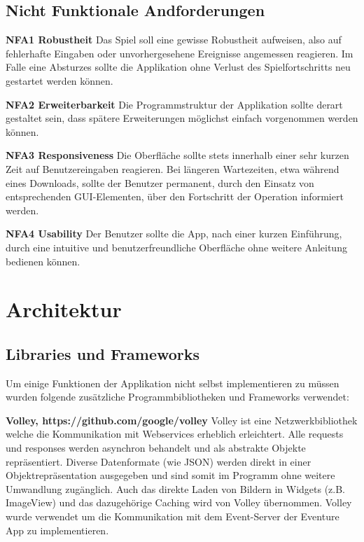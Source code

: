 \documentclass{scrartcl}
\begin{document}
\subsection{Nicht Funktionale Andforderungen}

\textbf{NFA1 Robustheit} \newline
Das Spiel soll eine gewisse Robustheit aufweisen, also auf fehlerhafte Eingaben
oder unvorhergesehene Ereignisse angemessen reagieren. Im Falle eine Absturzes
sollte die Applikation ohne Verlust des Spielfortschritts neu gestartet werden
können.

\textbf{NFA2 Erweiterbarkeit} \newline
Die Programmstruktur der Applikation sollte derart gestaltet sein, dass
spätere Erweiterungen möglichst einfach vorgenommen werden können.

\textbf{NFA3 Responsiveness} \newline
Die Oberfläche sollte stets innerhalb einer sehr kurzen Zeit auf
Benutzereingaben reagieren. Bei längeren Wartezeiten, etwa während eines
Downloads, sollte der Benutzer permanent, durch den Einsatz von entsprechenden
GUI-Elementen, über den Fortschritt der Operation informiert werden.

\textbf{NFA4 Usability} \newline
Der Benutzer sollte die App, nach einer kurzen Einführung, durch eine intuitive
und benutzerfreundliche Oberfläche ohne weitere Anleitung bedienen können.

\newpage

\section{Architektur}

\subsection{Libraries und Frameworks}

Um einige Funktionen der Applikation nicht selbst implementieren zu müssen
wurden folgende zusätzliche Programmbibliotheken und Frameworks verwendet:

\textbf{Volley, https://github.com/google/volley} \newline
Volley ist eine Netzwerkbibliothek welche die Kommunikation mit Webservices
erheblich erleichtert. Alle requests und responses werden asynchron behandelt
und als abstrakte Objekte repräsentiert. Diverse Datenformate (wie JSON) werden
direkt in einer Objektrepräsentation ausgegeben und sind somit im Programm ohne
weitere Umwandlung zugänglich. Auch das direkte Laden von Bildern in Widgets
(z.B. ImageView) und das dazugehörige Caching wird von Volley übernommen. Volley
wurde verwendet um die Kommunikation mit dem Event-Server der Eventure App zu implementieren.
\end{document}
